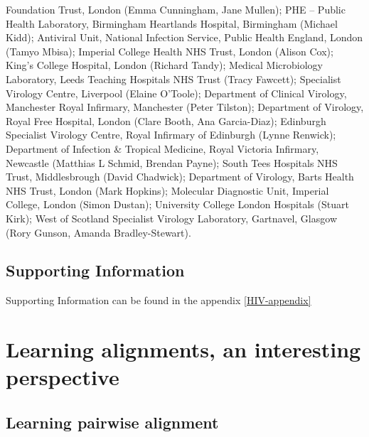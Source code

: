 \documentclass[
  11pt,
  twoside]{scrbook}
\begin{document}
\begin{description}
Foundation Trust, London (Emma Cunningham, Jane Mullen); PHE --
Public Health Laboratory, Birmingham Heartlands Hospital, Birmingham
(Michael Kidd); Antiviral Unit, National Infection Service, Public
Health England, London (Tamyo Mbisa); Imperial College Health NHS
Trust, London (Alison Cox); King's College Hospital, London (Richard
Tandy); Medical Microbiology Laboratory, Leeds Teaching Hospitals
NHS Trust (Tracy Fawcett); Specialist Virology Centre, Liverpool
(Elaine O'Toole); Department of Clinical Virology, Manchester Royal
Infirmary, Manchester (Peter Tilston); Department of Virology, Royal
Free Hospital, London (Clare Booth, Ana Garcia-Diaz); Edinburgh
Specialist Virology Centre, Royal Infirmary of Edinburgh (Lynne
Renwick); Department of Infection \& Tropical Medicine, Royal
Victoria Infirmary, Newcastle (Matthias L Schmid, Brendan Payne);
South Tees Hospitals NHS Trust, Middlesbrough (David Chadwick);
Department of Virology, Barts Health NHS Trust, London (Mark
Hopkins); Molecular Diagnostic Unit, Imperial College, London (Simon
Dustan); University College London Hospitals (Stuart Kirk); West of
Scotland Specialist Virology Laboratory, Gartnavel, Glasgow (Rory
Gunson, Amanda Bradley-Stewart).
\end{description}

\hypertarget{supporting-information}{%
\section*{Supporting Information}\label{supporting-information}}

Supporting Information can be found in the appendix \ref{HIV-appendix}

\printbibliography[segment=\therefsegment,heading=subbibintoc,title={References for chapter \thechapter}]

\hypertarget{learning-alignments-an-interesting-perspective}{%
\chapter{Learning alignments, an interesting perspective}\label{learning-alignments-an-interesting-perspective}}

\hypertarget{learning-pairwise-alignment}{%
\section{Learning pairwise alignment}\label{learning-pairwise-alignment}}
\end{document}
